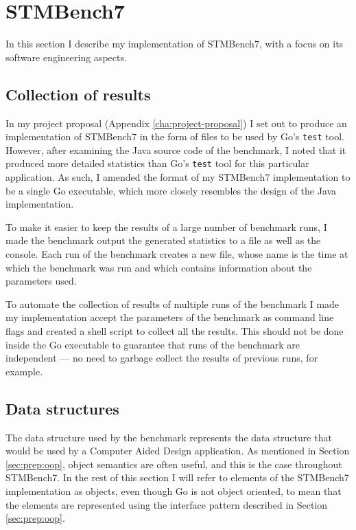 \documentclass[12pt,a4paper,oneside,openright]{report}
\begin{document}
\section{STMBench7}
\label{sec:impl:stmbench7}

In this section I describe my implementation of STMBench7, with a
focus on its software engineering aspects.

\subsection{Collection of results}
\label{sec:impl:collection-results}

In my project proposal (Appendix \ref{cha:project-proposal}) I set out
to produce an implementation of STMBench7 in the form of files to be
used by Go's \texttt{test} tool. However, after examining the Java
source code of the benchmark, I noted that it produced more detailed
statistics than Go's \texttt{test} tool for this particular
application. As such, I amended the format of my STMBench7
implementation to be a single Go executable, which more closely
resembles the design of the Java implementation.

To make it easier to keep the results of a large number of benchmark
runs, I made the benchmark output the generated statistics to a file
as well as the console. Each run of the benchmark creates a new file,
whose name is the time at which the benchmark was run and which
contains information about the parameters used.

To automate the collection of results of multiple runs of the
benchmark I made my implementation accept the parameters of the
benchmark as command line flags and created a shell script to collect
all the results. This should not be done inside the Go executable to
guarantee that runs of the benchmark are independent --- no need to
garbage collect the results of previous runs, for example.

\subsection{Data structures}
\label{sec:impl:data-structures}

The data structure used by the benchmark represents the data structure
that would be used by a Computer Aided Design application. As
mentioned in Section \ref{sec:prep:oop}, object semantics are often
useful, and this is the case throughout STMBench7. In the rest of this
section I will refer to elements of the STMBench7 implementation as
objects, even though Go is not object oriented, to mean that the
elements are represented using the interface pattern described in
Section \ref{sec:prep:oop}.
\end{document}
